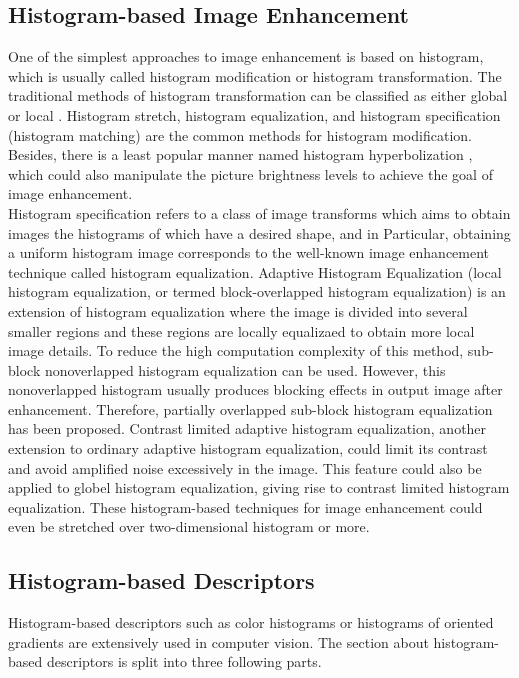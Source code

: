 \documentclass{article}
\begin{document}
\subsection{Histogram-based Image Enhancement}
One of the simplest approaches to image enhancement is based on histogram, which is usually called histogram modification or histogram transformation. The traditional methods of histogram transformation can be classified as either global\cite{Modification1978,Sapiro1997,Arici2009} or local \cite{Caselles1999}. Histogram stretch\cite{Alparslan1981}, histogram equalization\cite{Kundu1998}, and histogram specification (histogram matching)\cite{Coltuc2006,Wan2007,Mignotte2011,Sen2011} are the common methods for histogram modification. Besides, there is a least popular manner named histogram hyperbolization \cite{Nahin1979}, which could also manipulate the picture brightness levels to achieve the goal of image enhancement.\\
Histogram specification refers to a class of image transforms which aims to obtain images the histograms of which have a desired shape, and in Particular, obtaining a uniform histogram image corresponds to the well-known image enhancement technique called histogram equalization. Adaptive Histogram Equalization (local histogram equalization, or termed block-overlapped histogram equalization) is an extension of histogram equalization where the image is divided into several smaller regions and these regions are locally equalizaed to obtain more local image details. To reduce the high computation complexity of this method, sub-block nonoverlapped histogram equalization can be used. However, this nonoverlapped histogram usually produces blocking effects in output image after enhancement. Therefore, partially overlapped sub-block histogram equalization has been proposed\cite{Kim2001}. Contrast limited adaptive histogram equalization,	another extension to ordinary adaptive histogram equalization,  could limit its contrast and avoid amplified noise excessively in the image\cite{Zhu1999}. This feature could also be applied to globel histogram equalization, giving rise to contrast limited histogram equalization. These histogram-based techniques for image enhancement could even be stretched over two-dimensional histogram or more\cite{Celik2012}.
\subsection{Histogram-based Descriptors}
Histogram-based descriptors such as color histograms or histograms of oriented gradients are extensively used in computer vision. The section about histogram-based descriptors is split into three following parts.
\end{document}
